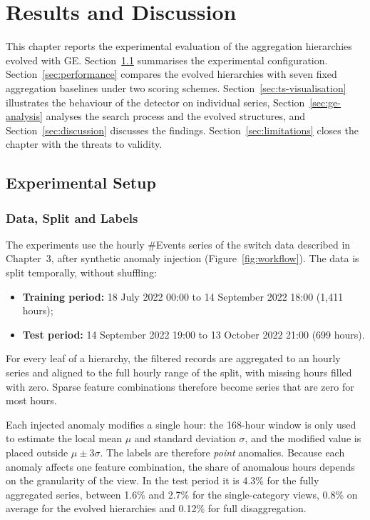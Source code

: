 \chapter{Results and Discussion}
\label{chap:results}

This chapter reports the experimental evaluation of the aggregation hierarchies evolved with \ac{GE}.
Section~\ref{sec:setup} summarises the experimental configuration.
Section~\ref{sec:performance} compares the evolved hierarchies with seven fixed aggregation baselines under two scoring schemes.
Section~\ref{sec:ts-visualisation} illustrates the behaviour of the detector on individual series, Section~\ref{sec:ge-analysis} analyses the search process and the evolved structures, and Section~\ref{sec:discussion} discusses the findings.
Section~\ref{sec:limitations} closes the chapter with the threats to validity.

\section{Experimental Setup}
\label{sec:setup}

\subsection{Data, Split and Labels}

The experiments use the hourly \#Events series of the switch data described in Chapter~3, after synthetic anomaly injection (Figure~\ref{fig:workflow}).
The data is split temporally, without shuffling:
\begin{itemize}
    \item \textbf{Training period:} 18 July 2022 00:00 to 14 September 2022 18:00 (1{,}411 hours);
    \item \textbf{Test period:} 14 September 2022 19:00 to 13 October 2022 21:00 (699 hours).
\end{itemize}
For every leaf of a hierarchy, the filtered records are aggregated to an hourly series and aligned to the full hourly range of the split, with missing hours filled with zero.
Sparse feature combinations therefore become series that are zero for most hours.

Each injected anomaly modifies a single hour: the 168-hour window is only used to estimate the local mean $\mu$ and standard deviation $\sigma$, and the modified value is placed outside $\mu \pm 3\sigma$.
The labels are therefore \emph{point} anomalies.
Because each anomaly affects one feature combination, the share of anomalous hours depends on the granularity of the view.
In the test period it is 4.3\% for the fully aggregated series, between 1.6\% and 2.7\% for the single-category views, 0.8\% on average for the evolved hierarchies and 0.12\% for full disaggregation.

